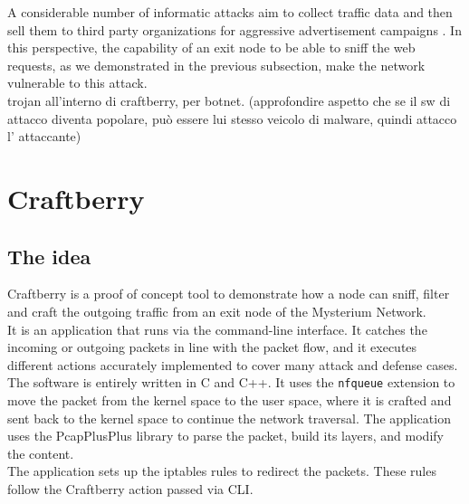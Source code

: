 \documentclass[12pt]{article}
\begin{document}
	A considerable number of informatic attacks aim to collect traffic data and then sell them to third party organizations for aggressive advertisement campaigns \cite{VPNsellData}. In this perspective, the capability of an exit node to be able to sniff the web requests, as we demonstrated in the previous subsection, make the network vulnerable to this attack.\\
	\bigbreak
	{trojan all'interno di craftberry, per botnet. (approfondire aspetto che se il sw di attacco diventa popolare, può essere lui stesso veicolo di malware, quindi attacco l' attaccante)}\\
	\section{Craftberry}

	\subsection{The idea}
	Craftberry is a proof of concept tool to demonstrate how a node can sniff, filter and craft the outgoing traffic from an exit node of the Mysterium Network.\\
	It is an application that runs via the command-line interface. It catches the incoming or outgoing packets in line with the packet flow, and it executes different actions accurately implemented to cover many attack and defense cases.\\
	The software is entirely written in C and C++. It uses the \lstinline{nfqueue} extension to move the packet from the kernel space to the user space, where it is crafted and sent back to the kernel space to continue the network traversal. The application uses the PcapPlusPlus library to parse the packet, build its layers, and modify the content.\\
	The application sets up the iptables rules to redirect the packets. These rules follow the Craftberry action passed via CLI.\\
	\bigbreak
\end{document}
